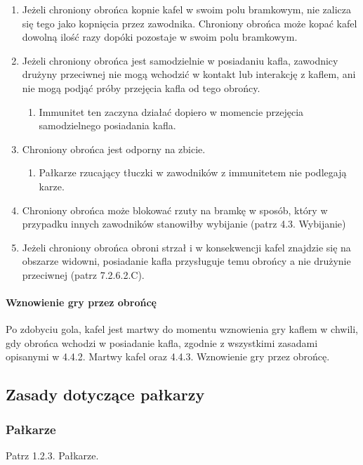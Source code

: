 \documentclass[12pt]{article}
\begin{document}
\begin{enumerate}
\item
    Jeżeli chroniony obrońca kopnie kafel w swoim polu bramkowym, nie
  zalicza się tego jako kopnięcia przez zawodnika. Chroniony obrońca
  może kopać kafel dowolną ilość razy dopóki pozostaje w swoim polu
  bramkowym.
  \item
    Jeżeli chroniony obrońca jest samodzielnie w posiadaniu kafla,
  zawodnicy drużyny przeciwnej nie mogą wchodzić w kontakt lub
  interakcję z kaflem, ani nie mogą podjąć próby przejęcia kafla od tego
  obrońcy.
  
  \begin{enumerate}
  \item
        Immunitet ten zaczyna działać dopiero w momencie przejęcia
    samodzielnego posiadania kafla.
      \end{enumerate}
\item
    Chroniony obrońca jest odporny na zbicie.
  
  \begin{enumerate}
  \item
        Pałkarze rzucający tłuczki w zawodników z immunitetem nie podlegają
    karze.
      \end{enumerate}
\item
    Chroniony obrońca może blokować rzuty na bramkę w sposób, który w
  przypadku innych zawodników stanowiłby wybijanie (patrz 4.3.
  Wybijanie)
  \item
    Jeżeli chroniony obrońca obroni strzał i w konsekwencji kafel znajdzie
  się na obszarze widowni, posiadanie kafla przysługuje temu obrońcy a
  nie drużynie przeciwnej (patrz 7.2.6.2.C).
  \end{enumerate}

\paragraph{Wznowienie gry przez obrońcę}
Po zdobyciu gola, kafel
jest martwy do momentu wznowienia gry kaflem w chwili, gdy obrońca
wchodzi w posiadanie kafla, zgodnie z wszystkimi zasadami opisanymi w
4.4.2. Martwy kafel oraz 4.4.3. Wznowienie gry przez obrońcę.

\subsection{Zasady dotyczące pałkarzy}

\subsubsection{Pałkarze}
Patrz 1.2.3. Pałkarze.
\end{document}
